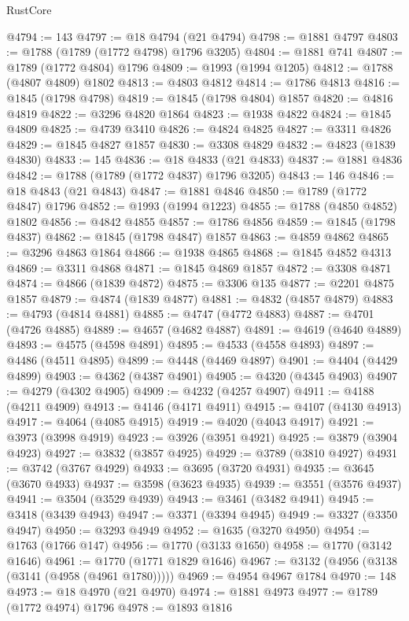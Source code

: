\begin{lexlean}{RustCore}
\begin{coremodule}
@4794 := 143
@4797 := @18 @4794 (@21 @4794)
@4798 := @1881 @4797
@4803 := @1788 (@1789 (@1772 @4798) @1796 @3205)
@4804 := @1881 @741
@4807 := @1789 (@1772 @4804) @1796
@4809 := @1993 (@1994 @1205)
@4812 := @1788 (@4807 @4809) @1802
@4813 := @4803 @4812
@4814 := @1786 @4813
@4816 := @1845 (@1798 @4798)
@4819 := @1845 (@1798 @4804) @1857
@4820 := @4816 @4819
@4822 := @3296 @4820 @1864
@4823 := @1938 @4822
@4824 := @1845 @4809
@4825 := @4739 @3410
@4826 := @4824 @4825
@4827 := @3311 @4826
@4829 := @1845 @4827 @1857
@4830 := @3308 @4829
@4832 := @4823 (@1839 @4830)
@4833 := 145
@4836 := @18 @4833 (@21 @4833)
@4837 := @1881 @4836
@4842 := @1788 (@1789 (@1772 @4837) @1796 @3205)
@4843 := 146
@4846 := @18 @4843 (@21 @4843)
@4847 := @1881 @4846
@4850 := @1789 (@1772 @4847) @1796
@4852 := @1993 (@1994 @1223)
@4855 := @1788 (@4850 @4852) @1802
@4856 := @4842 @4855
@4857 := @1786 @4856
@4859 := @1845 (@1798 @4837)
@4862 := @1845 (@1798 @4847) @1857
@4863 := @4859 @4862
@4865 := @3296 @4863 @1864
@4866 := @1938 @4865
@4868 := @1845 @4852 @4313
@4869 := @3311 @4868
@4871 := @1845 @4869 @1857
@4872 := @3308 @4871
@4874 := @4866 (@1839 @4872)
@4875 := @3306 @135
@4877 := @2201 @4875 @1857
@4879 := @4874 (@1839 @4877)
@4881 := @4832 (@4857 @4879)
@4883 := @4793 (@4814 @4881)
@4885 := @4747 (@4772 @4883)
@4887 := @4701 (@4726 @4885)
@4889 := @4657 (@4682 @4887)
@4891 := @4619 (@4640 @4889)
@4893 := @4575 (@4598 @4891)
@4895 := @4533 (@4558 @4893)
@4897 := @4486 (@4511 @4895)
@4899 := @4448 (@4469 @4897)
@4901 := @4404 (@4429 @4899)
@4903 := @4362 (@4387 @4901)
@4905 := @4320 (@4345 @4903)
@4907 := @4279 (@4302 @4905)
@4909 := @4232 (@4257 @4907)
@4911 := @4188 (@4211 @4909)
@4913 := @4146 (@4171 @4911)
@4915 := @4107 (@4130 @4913)
@4917 := @4064 (@4085 @4915)
@4919 := @4020 (@4043 @4917)
@4921 := @3973 (@3998 @4919)
@4923 := @3926 (@3951 @4921)
@4925 := @3879 (@3904 @4923)
@4927 := @3832 (@3857 @4925)
@4929 := @3789 (@3810 @4927)
@4931 := @3742 (@3767 @4929)
@4933 := @3695 (@3720 @4931)
@4935 := @3645 (@3670 @4933)
@4937 := @3598 (@3623 @4935)
@4939 := @3551 (@3576 @4937)
@4941 := @3504 (@3529 @4939)
@4943 := @3461 (@3482 @4941)
@4945 := @3418 (@3439 @4943)
@4947 := @3371 (@3394 @4945)
@4949 := @3327 (@3350 @4947)
@4950 := @3293 @4949
@4952 := @1635 (@3270 @4950)
@4954 := @1763 (@1766 @147)
@4956 := @1770 (@3133 @1650)
@4958 := @1770 (@3142 @1646)
@4961 := @1770 (@1771 @1829 @1646)
@4967 := @3132 (@4956 (@3138 (@3141 (@4958 (@4961 @1780)))))
@4969 := @4954 @4967 @1784
@4970 := 148
@4973 := @18 @4970 (@21 @4970)
@4974 := @1881 @4973
@4977 := @1789 (@1772 @4974) @1796
@4978 := @1893 @1816

\end{coremodule}
\end{lexlean}
